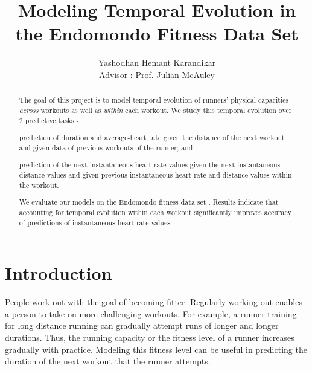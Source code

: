 \documentclass{acm_proc_article-sp}
\begin{document}
\sloppy

\title{Modeling Temporal Evolution in the Endomondo Fitness Data Set}
%
%
\author{
\alignauthor
Yashodhan Hemant Karandikar\\
\bigskip
       {Advisor : Prof. Julian McAuley}
}


\maketitle
\begin{abstract}
The goal of this project is to model temporal evolution of runners' physical capacities \emph{across} workouts as well as \emph{within} each workout. We study this temporal evolution over 2 predictive tasks -
\begin{inparaenum}
\item prediction of duration and average-heart rate given the distance of the next workout and given data of previous workouts of the runner; and
\item prediction of the next instantaneous heart-rate values given the next instantaneous distance values and given previous instantaneous heart-rate and distance values within the workout.
\end{inparaenum} 
We evaluate our models on the Endomondo fitness data set \cite{endomondo}. Results indicate that accounting for temporal evolution within each workout significantly improves accuracy of predictions of instantaneous heart-rate values.
\end{abstract}




\section{Introduction}
People work out with the goal of becoming fitter. Regularly working out enables a person to take on more challenging workouts. For example, a runner training for long distance running can gradually attempt runs of longer and longer durations. Thus, the running capacity or the fitness level of a runner increases gradually with practice. Modeling this fitness level can be useful in predicting the duration of the next workout that the runner attempts.
\end{document}
